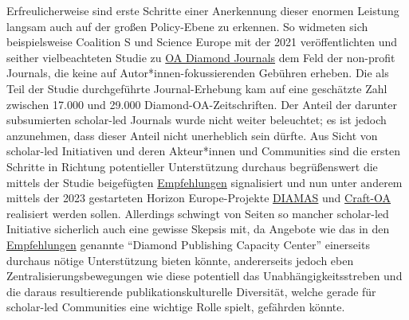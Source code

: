 \documentclass[a4paper,
fontsize=11pt,
oneside,
numbers=noperiodatend,
parskip=half-,
bibliography=totoc,
final
]{scrartcl}
\begin{document}
Erfreulicherweise sind erste Schritte einer Anerkennung dieser enormen
Leistung langsam auch auf der großen Policy-Ebene zu erkennen. So
widmeten sich beispielsweise Coalition S und Science Europe mit der 2021
veröffentlichten und seither vielbeachteten Studie zu
\href{https://www.coalition-s.org/diamond-unearthed-shining-light-on-community-driven-open-access-publishing/}{OA
Diamond Journals} dem Feld der non-profit Journals, die keine auf
Autor*innen-fokussierenden Gebühren erheben. Die als Teil der Studie
durchgeführte Journal-Erhebung kam auf eine geschätzte Zahl zwischen
17.000 und 29.000 Diamond-OA-Zeitschriften. Der Anteil der darunter
subsumierten scholar-led Journals wurde nicht weiter beleuchtet; es ist
jedoch anzunehmen, dass dieser Anteil nicht unerheblich sein dürfte. Aus
Sicht von scholar-led Initiativen und deren Akteur*innen und Communities
sind die ersten Schritte in Richtung potentieller Unterstützung durchaus
begrüßenswert die mittels der Studie beigefügten
\href{https://doi.org/10.5281/zenodo.4562790}{Empfehlungen} signalisiert
und nun unter anderem mittels der 2023 gestarteten Horizon
Europe-Projekte \href{https://diamasproject.eu/}{DIAMAS} und
\href{https://www.craft-oa.eu/}{Craft-OA} realisiert werden sollen.
Allerdings schwingt von Seiten so mancher scholar-led Initiative
sicherlich auch eine gewisse Skepsis mit, da Angebote wie das in den
\href{https://doi.org/10.5281/zenodo.4562790}{Empfehlungen} genannte
\enquote{Diamond Publishing Capacity Center} einerseits durchaus nötige
Unterstützung bieten könnte, andererseits jedoch eben
Zentralisierungsbewegungen wie diese potentiell das
Unabhängigkeitsstreben und die daraus resultierende
publikationskulturelle Diversität, welche gerade für scholar-led
Communities eine wichtige Rolle spielt, gefährden könnte.
\end{document}
